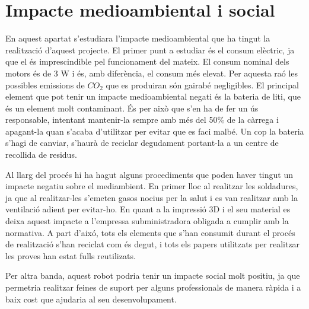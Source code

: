 \setlength\topmargin{8mm}
\onehalfspacing
\chapter{Impacte medioambiental i social} %

\label{Chapter8} %




En aquest apartat s'estudiara l'impacte medioambiental que ha tingut la realització d'aquest projecte. El primer punt a estudiar és el consum elèctric, ja que el és imprescindible pel funcionament del mateix. El consum nominal dels motors és de 3 W i és, amb diferència, el consum més elevat. Per aquesta raó les possibles emissions de $CO_{2}$ que es produiran són gairabé negligibles. El principal element que pot tenir un impacte medioambiental negati és la bateria de liti, que és un element molt contaminant. És per això que s'en ha de fer un ús responsable, intentant mantenir-la sempre amb més del 50\% de la càrrega i apagant-la quan s'acaba d'utilitzar per evitar que es faci malbé. Un cop la bateria s'hagi de canviar, s'haurà de reciclar degudament portant-la a un centre de recollida de residus. 

Al llarg del procés hi ha hagut alguns procediments que poden haver tingut un impacte negatiu sobre el mediambient. En primer lloc al realitzar les soldadures, ja que al realitzar-les s'emeten gasos nocius per la salut i es van realitzar amb la ventilació adient per evitar-ho. En quant a la impressió 3D i el seu material es deixa aquest impacte a l'empressa subministradora obligada a cumplir amb la normativa. A part d'aixó, tots els elements que s'han consumit durant el procés de realització s'han reciclat com és degut, i tots els papers utilitzats per realitzar les proves han estat fulls reutilizats. 

Per altra banda, aquest robot podria tenir un impacte social molt positiu, ja que permetria realitzar feines de suport per alguns professionals de manera ràpida i a baix cost que ajudaria al seu desenvolupament. 
